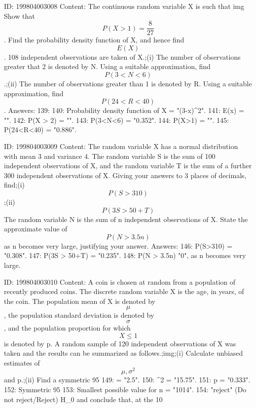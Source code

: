 \documentclass{article}
\begin{document}
ID: 199804003008
Content:
The continuous random variable X is such that img Show that $$P(X > 1) = \frac{8}{27}$$.  Find the probability density function of X, and hence find $$E(X)$$.  108 independent observations are taken of X.;(i) The number of observations greater that 2 is denoted by N. Using a suitable approximation, find $$P(3 < N < 6)$$.;(ii) The number of observations greater than 1 is denoted by R. Using a suitable approximation, find $$P(24 < R < 40)$$. Answers:
139: 
140: Probability density function of X = "(3-x)^2".
141: E(x) = "".
142: P(X > 2) = "".
143: P(3<N<6) = "0.352".
144: P(X>1) = "".
145: P(24<R<40) = "0.886".

ID: 199804003009
Content:
The random variable X has a normal distribution with mean 3 and variance 4. The random variable S is the sum of 100 independent observations of X, and the random variable T is the sum of a further 300 independent observations of X. Giving your answers to 3 places of decimals, find;(i) $$P(S > 310)$$;(ii) $$P(3S > 50+T)$$ The random variable N is the sum of n independent observations of X. State the approximate value of $$P(N > 3.5n)$$ as n becomes very large, justifying your answer.  Answers:
146: P(S>310) = "0.308".
147: P(3S > 50+T) = "0.235".
148: P(N > 3.5n) \approx "0", as n becomes very large.

ID: 199804003010
Content:
A coin is chosen at random from a population of recently produced coins. The discrete random variable X is the age, in years, of the coin. The population mean of X is denoted by $$\mu$$, the population standard deviation is denoted by $$\sigma$$, and the population proportion for which $$X \leq 1 $$is denoted by p. A random sample of 120 independent observations of X was taken and the results can be summarized as follows.;img;(i) Calculate unbiased estimates of $$\mu, \sigma^2$$ and p.;(ii) Find a symmetric 95%
149: \mu = "2.5".
150: \sigma^2 = "15.75".
151: p = "0.333".
152: Symmetric 95%
153: Smallest possible value for n = "1014".
154: "reject" (Do not reject/Reject) H_0 and conclude that, at the 10%
\end{document}

